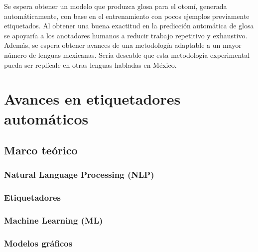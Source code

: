 \documentclass[letterpaper,12pt,oneside]{book}
\theoremstyle{definition}
\begin{document}
Se espera obtener un modelo que produzca glosa para el otomí, generada automáticamente, con base en el entrenamiento con pocos ejemplos previamente etiquetados. Al obtener una buena exactitud en la predicción automática de glosa se apoyaría a los anotadores humanos a reducir trabajo repetitivo y exhaustivo. Además, se espera obtener avances de una metodología adaptable a un mayor número de lenguas mexicanas. Sería deseable que esta metodología experimental pueda ser replícale en otras lenguas habladas en México.

\chapter{Avances en etiquetadores automáticos}


\section{Marco teórico}\label{sec:marco}



\subsection{Natural Language Processing (NLP)}

\subsection{Etiquetadores}

\subsection{Machine Learning (ML)}

\subsection{Modelos gráficos}


\end{document}
